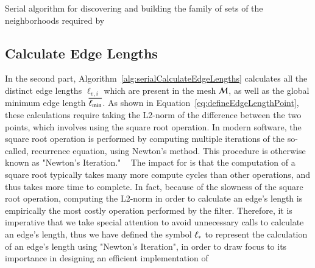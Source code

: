 \begin{algorithm}
	\DontPrintSemicolon


	\bigskip
	\;
\nl	{}
	\caption{Serial algorithm for discovering and building the family of sets of the neighborhoods required by  \label{alg:serialBuildNeighborhoods}}
\end{algorithm}%
%


%
%
%
\subsection{Calculate Edge Lengths}
\label{ch5sSIssCEL}
In the second part, Algorithm~\ref{alg:serialCalculateEdgeLengths} calculates all the distinct edge lengths $\ell_{v,i}$ which are present in the mesh $\mathcal{M}$, as well as the global minimum edge length $\overline{\ell_\text{min}}$. As shown in Equation~\ref{eq:defineEdgeLengthPoint}, these calculations require taking the L2-norm of the difference between the two points, which involves using the square root operation. In modern software, the square root operation is performed by computing multiple iterations of the so-called, recurrence equation, using Newton's method. This procedure is otherwise known as "Newton's Iteration." ~\cite{Weisstein19b} The impact for  is that the computation of a square root typically takes many more compute cycles than other operations, and thus takes more time to complete. In fact, because of the slowness of the square root operation, computing the L2-norm in order to calculate an edge's length is empirically the most costly operation performed by the filter. Therefore, it is imperative that we take special attention to avoid unnecessary calls to calculate an edge's length, thus we have defined the symbol $\ell_\ast$ to represent the calculation of an edge's length using "Newton's Iteration", in order to draw focus to its importance  in designing an efficient implementation of 

